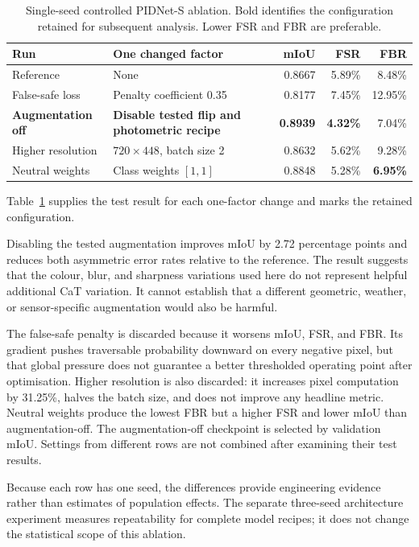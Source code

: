 \begin{table}[H]
\centering
\caption{Single-seed controlled PIDNet-S ablation. Bold identifies the
configuration retained for subsequent analysis. Lower FSR and FBR are
preferable.}
\label{tab:pidnet_controlled_ablation}
\small
\begin{tabularx}{\textwidth}{@{}lXrrr@{}}
\toprule
\textbf{Run} & \textbf{One changed factor} & \textbf{mIoU} & \textbf{FSR} & \textbf{FBR} \\
\midrule
Reference & None & 0.8667 & 5.89\% & 8.48\% \\
False-safe loss & Penalty coefficient 0.35 & 0.8177 & 7.45\% & 12.95\% \\
\textbf{Augmentation off} & \textbf{Disable tested flip and photometric recipe} & \textbf{0.8939} & \textbf{4.32\%} & 7.04\% \\
Higher resolution & $720\times448$, batch size 2 & 0.8632 & 5.62\% & 9.28\% \\
Neutral weights & Class weights $[1,1]$ & 0.8848 & 5.28\% & \textbf{6.95\%} \\
\bottomrule
\end{tabularx}
\end{table}

Table~\ref{tab:pidnet_controlled_ablation} supplies the test result for each
one-factor change and marks the retained configuration.

Disabling the tested augmentation improves mIoU by 2.72 percentage points and
reduces both asymmetric error rates relative to the reference. The result
suggests that the colour, blur, and sharpness variations used here do not
represent helpful additional CaT variation. It cannot establish that a
different geometric, weather, or sensor-specific augmentation would also be
harmful.

The false-safe penalty is discarded because it worsens mIoU, FSR, and FBR.
Its gradient pushes traversable probability downward on every negative pixel,
but that global pressure does not guarantee a better thresholded operating
point after optimisation. Higher resolution is also discarded: it increases
pixel computation by 31.25\%, halves the batch size, and does not improve any
headline metric. Neutral weights produce the lowest FBR but a higher FSR and
lower mIoU than augmentation-off. The augmentation-off checkpoint is selected
by validation mIoU. Settings from different rows are not combined after
examining their test results.

Because each row has one seed, the differences provide engineering evidence
rather than estimates of population effects. The separate three-seed
architecture experiment measures repeatability for complete model recipes; it
does not change the statistical scope of this ablation.


